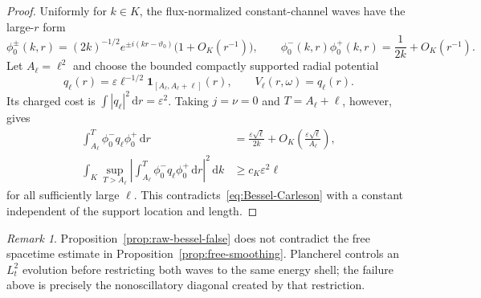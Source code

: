 \documentclass[11pt]{article}
\newcommand{\dd}{\,\mathrm d}
\newcommand{\eps}{\varepsilon}
\theoremstyle{definition}
\theoremstyle{remark}
\newtheorem{remark}[theorem]{Remark}
\begin{document}
\begin{proof}
Uniformly for $k\in K$, the flux-normalized constant-channel waves have the large-$r$ form
\begin{equation}
 \phi_0^\pm(k,r)
 =(2k)^{-1/2}e^{\pm i(kr-\vartheta_0)}
 \bigl(1+O_K(r^{-1})\bigr),
 \qquad
 \phi_0^-(k,r)\phi_0^+(k,r)
 =\frac1{2k}+O_K(r^{-1}).
 \label{eq:forward-bessel-product}
\end{equation}
Let $A_\ell=\ell^2$ and choose the bounded compactly supported radial potential
\begin{equation}
 q_\ell(r)=\eps\ell^{-1/2}\mathbf1_{[A_\ell,A_\ell+\ell]}(r),
 \qquad
 V_\ell(r,\omega)=q_\ell(r).
 \label{eq:forward-counterexample}
\end{equation}
Its charged cost is $\int|q_\ell|^2\dd r=\eps^2$.  Taking $j=\nu=0$ and $T=A_\ell+\ell$, however, gives
\begin{align}
 \int_{A_\ell}^{T}
 \phi_0^-q_\ell\phi_0^+\dd r
 &=\frac{\eps\sqrt\ell}{2k}
   +O_K\!\left(\frac{\eps\sqrt\ell}{A_\ell}\right),
 \label{eq:forward-counterexample-amplitude}\\
 \int_K\sup_{T>A_\ell}
 \left|\int_{A_\ell}^{T}\phi_0^-q_\ell\phi_0^+\dd r\right|^2\dd k
 &\geq c_K\eps^2\ell
 \label{eq:forward-counterexample-growth}
\end{align}
for all sufficiently large $\ell$.  This contradicts~\eqref{eq:Bessel-Carleson} with a constant independent of the support location and length.
\end{proof}

\begin{remark}
Proposition~\ref{prop:raw-bessel-false} does not contradict the free spacetime estimate in Proposition~\ref{prop:free-smoothing}.  Plancherel controls an $L_t^2$ evolution before restricting both waves to the same energy shell; the failure above is precisely the nonoscillatory diagonal created by that restriction.
\end{remark}
\end{document}
